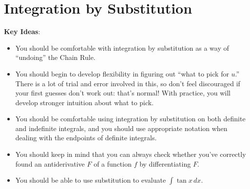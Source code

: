 \documentclass[main]{subfiles}
\begin{document}
\ifSubfilesClassLoaded{%
  \chaptermark{\chaptersix}
}{}

\section{Integration by Substitution} \label{ws6-1}

\begin{problemonly}
    \begin{framed}

\textbf{Key Ideas}:

\begin{itemize}[topsep=0pt,partopsep=0pt,parsep=8pt,itemsep=0pt]

\item You should be comfortable with integration by substitution as a
  way of ``undoing'' the Chain Rule.

\item You should begin to develop flexibility in figuring out ``what to
  pick for $u$.''  There is a lot of trial and error involved in this,
  so don't feel discouraged if your first guesses don't work out: that's
  normal!  With practice, you will develop stronger intuition about what
  to pick.

\item You should be comfortable using integration by substitution on
  both definite and indefinite integrals, and you should use appropriate
  notation when dealing with the endpoints of definite integrals.

\item You should keep in mind that you can always check whether you've
  correctly found an antiderivative $F$ of a function $f$ by
  differentiating $F$.

\item You should be able to use substitution to evaluate $\displaystyle
  \int \tan x \,dx$.

\end{itemize}
\end{framed}
\end{problemonly}
\end{document}

